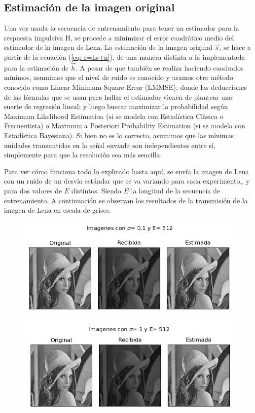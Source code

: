 \subsection{Estimaci\'on de la imagen original}
Una vez usada la secuencia de entrenamiento para tener un estimador para la respuesta impulsiva H, se procede a minimizar el error cuadrático medio del estimador de la imagen de Lena. La estimaci\'on de la imagen original $\vec{s}$, se hace a partir de la ecuaci\'on (\ref{eq: r=hs+n}), de una manera distinta a la implementada para la estimaci\'on de  $\vec{h}$. A pesar de que tambi\'en se realiza haciendo cuadrados m\'inimos, asumimos que el nivel de ruido es conocido y usamos otro m\'etodo  conocido como Linear Minimum Square Error (LMMSE); donde las deducciones de las f\'ormulas que se usan para hallar el estimador vienen de plantear una suerte de regresi\'on lineal; y luego buscar maximizar la probabilidad seg\'un Maximum Likelihood Estimation (si se modela con Estad\'istica Cl\'asica o Frecuentista) o Maximum a Posteriori Probability Estimation (si se modela con Estad\'istica Bayesiana).  Si bien no es lo correcto, asumimos que las m\'inimas unidades transmitidas en la se\~nal enviada son independientes entre s\'i, simplemente para que la resoluci\'on sea m\'as sencilla. 

Para ver c\'omo funciona todo lo explicado hasta aqu\'i, se env\'ia la imagen de Lena con un ruido de un desv\'io est\'andar que se va variando para cada experimento,, y para dos valores de $E$ distintos. Siendo $E$ la longitud de la secuencia de entrenamiento. A continuaci\'on se observan los resultados de la transmisi\'on de la imagen de Lena en escala de grises.

\begin{figure}[H]
	\includegraphics[scale=1.5]{Imagenes/1}
	\centering
\end{figure}

\begin{figure}[H]
	\includegraphics[scale=1.5]{Imagenes/2}
	\centering
\end{figure}
 

